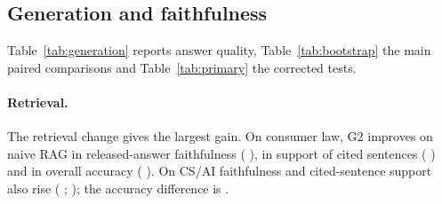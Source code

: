


\subsection{Generation and faithfulness}
\label{sec:res-generation}

Table~\ref{tab:generation} reports answer quality, Table~\ref{tab:bootstrap} the main paired comparisons and Table~\ref{tab:primary} the corrected tests.

\paragraph{Retrieval.}
The retrieval change gives the largest gain. On consumer law, G2 improves on naive RAG in released-answer faithfulness ( ), in support of cited sentences ( ) and in overall accuracy ( ).
On CS/AI faithfulness and cited-sentence support also rise ( ;  ); the accuracy difference is .

